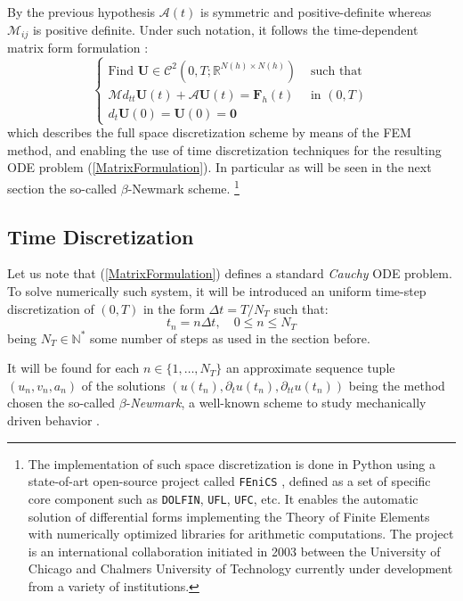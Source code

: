 By the previous hypothesis $\mathcal{A}(t)$ is symmetric and positive-definite whereas $\mathcal{M}_{ij}$ is positive definite. Under such notation, it follows the time-dependent matrix form formulation :
\begin{equation}
    \label{MatrixFormulation}
    \left \{
    \begin{array}{cc}
        \text{Find } \mathbf{U} \in \mathcal{C}^2(0,T; \mathbb{R}^{N(h)\times N(h)}) & \text{ such that} \\
        \mathcal{M} d_{tt} \mathbf{U}(t) + \mathcal{A}\mathbf{U}(t) = \mathbf{F}_h (t) & \text{ in }(0,T)\\ 
        d_{t} \mathbf{U}(0) = \mathbf{U}(0)  = \mathbf{0}&
    \end{array}
    \right.
\end{equation}
which describes the full space discretization scheme by means of the FEM method, and enabling the use of time discretization techniques for the resulting ODE problem (\ref{MatrixFormulation}). In particular as will be seen in the next section the so-called $\beta$-Newmark scheme. \footnote{The implementation of such space discretization is done in Python using a state-of-art open-source project called \texttt{FEniCS} \cite{logg2012automated}, defined as a set of specific core component such as \texttt{DOLFIN}, \texttt{UFL},  \texttt{UFC}, etc. It enables the automatic solution of differential forms implementing the Theory of Finite Elements with numerically optimized libraries for arithmetic computations. The project is an international collaboration initiated in 2003 between the University of Chicago and Chalmers University of Technology currently under development from a variety of institutions.}

\subsection{Time Discretization}
Let us note that (\ref{MatrixFormulation}) defines a standard \textit{Cauchy} ODE problem. To solve numerically such system, it will be introduced an uniform time-step discretization of $(0,T)$ in the form $\Delta t = T/N_T$ such that:
\begin{equation*}
    t_n = n \Delta t, \quad 0 \leq n \leq N_T
\end{equation*}
being $N_T \in \mathbb{N}^*$ some number of steps as used in the section before.

It will be found for each $n \in \{1,\dots, N_T \}$ an approximate sequence tuple $(u_n, v_n, a_n)$ of the solutions $(u(t_n), \partial_{t} u(t_n), \partial_{tt} u(t_n))$ being the method chosen the so-called $\beta$-\textit{Newmark}, a well-known scheme to study mechanically driven behavior \cite{raviart1983introduction}.

